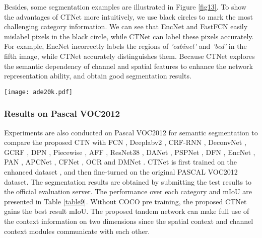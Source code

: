 \documentclass[10pt,journal,cspaper,compsoc]{IEEEtran}
\begin{document}
Besides, some segmentation examples are illustrated in Figure \ref{fig13}. To show the advantages of CTNet more intuitively, we use black circles to mark the most challenging category information. We can see that EncNet and FastFCN easily mislabel pixels in the black circle, while CTNet can label these pixels accurately. For example, EncNet incorrectly labels the regions of \textit{'cabinet'} and \textit{'bed'} in the fifth image, while CTNet accurately distinguishes them. Because CTNet explores the semantic dependency of channel and spatial features to enhance the network representation ability, and obtain good segmentation results.
\begin{figure*}
	\centering
	\texttt{[image: ade20k.pdf]}
		\caption{Visualization results of EncNet, FastFCN, and CTNet on ADE20K. (a) input image, (b) GT, (c) CTNet, (d) EncNet, and (e) FastFCN.}
	\label{fig13}
\vspace{-4mm}
\end{figure*}
	
	
\subsubsection{Results on Pascal VOC2012}
Experiments are also conducted on Pascal VOC2012 for semantic segmentation to compare the proposed CTN with FCN \cite{shelhamer2017fully}, Deeplabv2 \cite{chen2017deeplab}, CRF-RNN \cite{zheng2015conditional}, DeconvNet \cite{noh2015learning}, GCRF \cite{vemulapalli2016gaussian}, DPN \cite{liu2015semantic}, Piecewise \cite{lin2016efficient}, AFF \cite{ke2018adaptive}, ResNet38 \cite{wu2019wider}, DANet \cite{fu2019dual}, PSPNet \cite{zhao2017pyramid}, DFN \cite{yu2018learning}, EncNet \cite{zhang2018context}, PAN \cite{li2018pyramid}, APCNet \cite{he2019adaptive}, CFNet \cite{zhang2019co}, OCR \cite{yuan2020object} and DMNet \cite{he2019dynamic}. CTNet is first trained on the enhanced dataset \cite{hariharan2015hypercolumns}, and then fine-turned on the original PASCAL VOC2012 dataset. The segmentation results are obtained by submitting the test results to the official evaluation server. The performance over each category and mIoU are presented in Table \ref{table9}. Without COCO pre training, the proposed CTNet gains the best result  mIoU. The proposed tandem network can make full use of the context information on two dimensions since the spatial context and channel context modules communicate with each other. 
\end{document}
